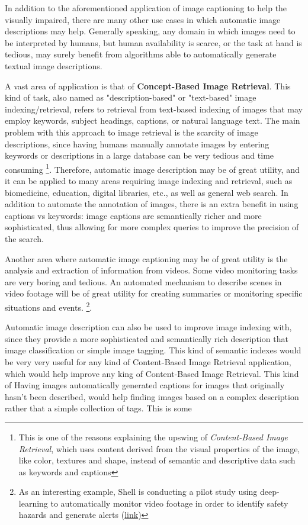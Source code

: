 In addition to the aforementioned application of image captioning to help the visually impaired, there are many other use cases in which automatic image descriptions may help. Generally speaking, any domain in which images need to be interpreted by humans, but human availability is scarce, or the task at hand is tedious, may surely benefit from algorithms able to automatically generate textual image descriptions.

A vast area of application is that of \textbf{Concept-Based Image Retrieval}. This kind of task, also named as "description-based" or "text-based" image indexing/retrieval, refers to retrieval from text-based indexing of images that may employ keywords, subject headings, captions, or natural language text. The main problem with this approach to image retrieval is the scarcity of image descriptions, since having humans manually annotate images by entering keywords or descriptions in a large database can be very tedious and time consuming \footnote{This is one of the reasons explaining the upswing of \textit{Content-Based Image Retrieval}, which uses content derived from the visual properties of the image, like color, textures and shape, instead of semantic and descriptive data such as keywords and captions}.  Therefore, automatic image description may be of great utility, and it can be applied to many areas requiring image indexing and retrieval, such as biomedicine, education, digital libraries, etc., as well as general web search. In addition to automate the annotation of images, there is an extra benefit in using captions vs keywords: image captions are semantically richer and more sophisticated, thus allowing for more complex queries to improve the precision of the search.

Another area where automatic image captioning may be of great utility is the analysis and extraction of information from videos. Some video monitoring tasks are very boring and tedious. An automated mechanism to describe scenes in video footage will be of great utility for creating summaries or monitoring specific situations and events. \footnote{As an interesting example, Shell is conducting a pilot study using deep-learning to automatically monitor video footage in order to identify safety hazards and generate alerts (\href{https://customers.microsoft.com/en-us/story/shell-mining-oil-gas-azure-databricks}{link})}.

Automatic image description can also be used to improve image indexing with, since they provide a more sophisticated and semantically rich description that image classification or simple image tagging. This kind of semantic indexes would be very very useful for any kind of Content-Based Image Retrieval application, which would help improve any king of Content-Based Image Retrieval. This kind of Having images automatically generated captions for images that originally hasn't been described, would help finding images based on a complex description rather that a simple collection of tags. This is some

